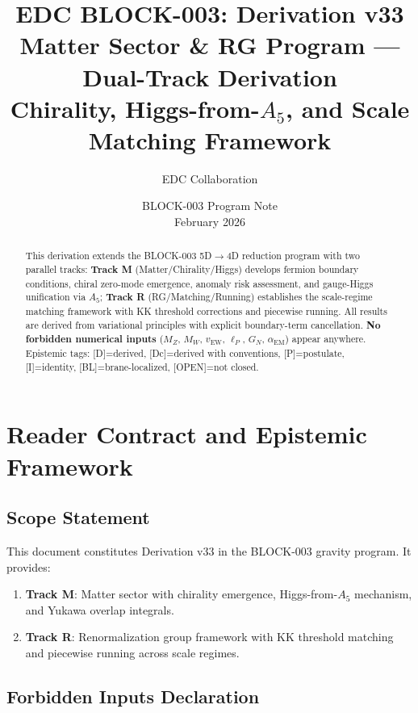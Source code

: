 \documentclass[11pt,a4paper]{article}
\title{\textbf{EDC BLOCK-003: Derivation v33}\\[0.5em]
\Large Matter Sector \& RG Program --- Dual-Track Derivation\\[0.3em]
\large Chirality, Higgs-from-$A_5$, and Scale Matching Framework}
\author{EDC Collaboration}
\date{BLOCK-003 Program Note\\February 2026}
\begin{document}
\maketitle

\begin{abstract}
This derivation extends the BLOCK-003 5D$\to$4D reduction program with two parallel tracks:
\textbf{Track M} (Matter/Chirality/Higgs) develops fermion boundary conditions, chiral zero-mode
emergence, anomaly risk assessment, and gauge-Higgs unification via $A_5$;
\textbf{Track R} (RG/Matching/Running) establishes the scale-regime matching framework with
KK threshold corrections and piecewise running. All results are derived from variational
principles with explicit boundary-term cancellation. \textbf{No forbidden numerical inputs}
($M_Z$, $M_W$, $v_{\text{EW}}$, $\ell_P$, $G_N$, $\alpha_{\text{EM}}$) appear anywhere.
Epistemic tags: [D]=derived, [Dc]=derived with conventions, [P]=postulate,
[I]=identity, [BL]=brane-localized, [OPEN]=not closed.
\end{abstract}

\tableofcontents
\newpage

\section{Reader Contract and Epistemic Framework}
\label{sec:contract}

\subsection{Scope Statement}

This document constitutes Derivation v33 in the BLOCK-003 gravity program. It provides:
\begin{enumerate}
\item \textbf{Track M}: Matter sector with chirality emergence, Higgs-from-$A_5$ mechanism,
      and Yukawa overlap integrals.
\item \textbf{Track R}: Renormalization group framework with KK threshold matching and
      piecewise running across scale regimes.
\end{enumerate}

\subsection{Forbidden Inputs Declaration}
\end{document}
